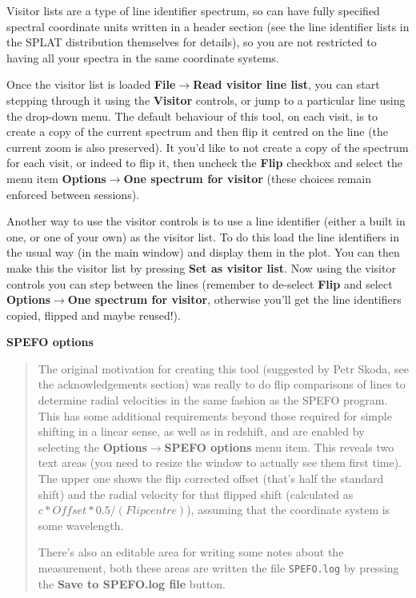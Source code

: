 \documentclass[twoside,11pt]{article}
\newcommand{\latexhtml}[2]{#1}
\renewcommand{\_}{\texttt{\symbol{95}}}
\newcommand{\submenuitem}[2]{\latexhtml{\textbf{#1$\rightarrow$#2}}{\textbf{#1->#2}}}
\newcommand{\labelitem}[1]{\textbf{#1}}
\newcommand{\hitext}[1]{\texttt{#1}}
\newcommand{\subheading}[1]{\textbf{\large{#1}}}
\begin{document}
Visitor lists are a type of line identifier spectrum, so can have fully
specified spectral coordinate units written in a header section (see the line
identifier lists in the SPLAT distribution themselves for details), so you are
not restricted to having all your spectra in the same coordinate systems.

Once the visitor list is loaded \submenuitem{File}{Read visitor line list},
you can start stepping through it using the \labelitem{Visitor} controls, or
jump to a particular line using the drop-down menu. The default behaviour of
this tool, on each visit, is to create a copy of the current spectrum and then
flip it centred on the line (the current zoom is also preserved). It you'd
like to not create a copy of the spectrum for each visit, or indeed to flip
it, then uncheck the \labelitem{Flip} checkbox and select the menu item
\submenuitem{Options}{One spectrum for visitor} (these choices remain enforced
between sessions).

Another way to use the visitor controls is to use a line identifier (either a
built in one, or one of your own) as the visitor list. To do this load the
line identifiers in the usual way (in the main window) and display them in the
plot. You can then make this the visitor list by pressing
\labelitem{Set as visitor list}. Now using the visitor controls you can step
between the lines (remember to de-select \labelitem{Flip} and select
\submenuitem{Options}{One spectrum for visitor}, otherwise you'll get the line
identifiers copied, flipped and maybe reused!).

\subheading{SPEFO options}
\begin{quote}
The original motivation for creating this tool (suggested by Petr Skoda, see
the acknowledgements section) was really to do flip comparisons of lines to
determine radial velocities in the same fashion as the SPEFO program. This has
some additional requirements beyond those required for simple shifting in a
linear sense, as well as in redshift, and are enabled by selecting the
\submenuitem{Options}{SPEFO options} menu item. This reveals two text areas
(you need to resize the window to actually see them first time). The upper one
shows the flip corrected offset (that's half the standard shift) and the
radial velocity for that flipped shift
(calculated as $c*Offset*0.5/(Flip centre)$),
assuming that the coordinate system is some wavelength.

There's also an editable area for writing some notes about the measurement,
both these areas are written the file \hitext{SPEFO.log} by pressing the
\labelitem{Save to SPEFO.log file} button.

\end{quote}
\end{document}
